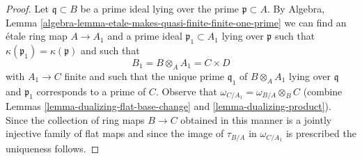 \documentclass[10pt,a4paper]{amsart}
\theoremstyle{plain}
\theoremstyle{definition}
\theoremstyle{remark}
\numberwithin{equation}{subsection}
\begin{document}
\begin{proof}
Let $\mathfrak q \subset B$ be a prime ideal lying over the prime
$\mathfrak p \subset A$. By
Algebra, Lemma \ref{algebra-lemma-etale-makes-quasi-finite-finite-one-prime}
we can find an \'etale ring map $A \to A_1$ and a prime
ideal $\mathfrak p_1 \subset A_1$ lying over $\mathfrak p$
such that $\kappa(\mathfrak p_1) = \kappa(\mathfrak p)$ and
such that
$$
B_1 = B \otimes_A A_1 = C \times D
$$
with $A_1 \to C$ finite and such that the unique prime $\mathfrak q_1$
of $B \otimes_A A_1$ lying over $\mathfrak q$ and $\mathfrak p_1$
corresponds to a prime of $C$. Observe that
$\omega_{C/A_1} = \omega_{B/A} \otimes_B C$
(combine Lemmas \ref{lemma-dualizing-flat-base-change} and
\ref{lemma-dualizing-product}). Since the collection
of ring maps $B \to C$ obtained in this manner is a jointly
injective family of flat maps and since the image of $\tau_{B/A}$
in $\omega_{C/A_1}$ is prescribed the uniqueness follows.
\end{proof}
\end{document}
